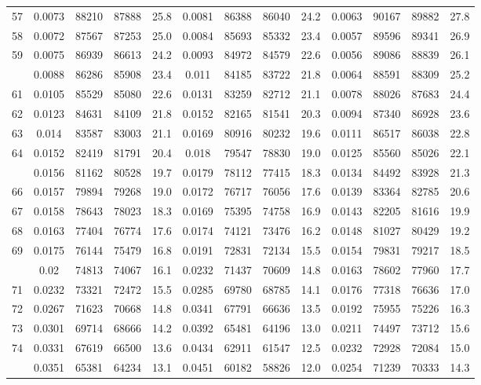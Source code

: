 \documentclass[
  14pt,
]{article}
\begin{document}
\begin{longtable}[t]{lcccccccccccc}
57 & 0.0073 & 88210 & 87888 & 25.8 & 0.0081 & 86388 & 86040 & 24.2 & 0.0063 & 90167 & 89882 & 27.8\\
58 & 0.0072 & 87567 & 87253 & 25.0 & 0.0084 & 85693 & 85332 & 23.4 & 0.0057 & 89596 & 89341 & 26.9\\
59 & 0.0075 & 86939 & 86613 & 24.2 & 0.0093 & 84972 & 84579 & 22.6 & 0.0056 & 89086 & 88839 & 26.1\\
\addlinespace
60 & 0.0088 & 86286 & 85908 & 23.4 & 0.011 & 84185 & 83722 & 21.8 & 0.0064 & 88591 & 88309 & 25.2\\
61 & 0.0105 & 85529 & 85080 & 22.6 & 0.0131 & 83259 & 82712 & 21.1 & 0.0078 & 88026 & 87683 & 24.4\\
62 & 0.0123 & 84631 & 84109 & 21.8 & 0.0152 & 82165 & 81541 & 20.3 & 0.0094 & 87340 & 86928 & 23.6\\
63 & 0.014 & 83587 & 83003 & 21.1 & 0.0169 & 80916 & 80232 & 19.6 & 0.0111 & 86517 & 86038 & 22.8\\
64 & 0.0152 & 82419 & 81791 & 20.4 & 0.018 & 79547 & 78830 & 19.0 & 0.0125 & 85560 & 85026 & 22.1\\
\addlinespace
65 & 0.0156 & 81162 & 80528 & 19.7 & 0.0179 & 78112 & 77415 & 18.3 & 0.0134 & 84492 & 83928 & 21.3\\
66 & 0.0157 & 79894 & 79268 & 19.0 & 0.0172 & 76717 & 76056 & 17.6 & 0.0139 & 83364 & 82785 & 20.6\\
67 & 0.0158 & 78643 & 78023 & 18.3 & 0.0169 & 75395 & 74758 & 16.9 & 0.0143 & 82205 & 81616 & 19.9\\
68 & 0.0163 & 77404 & 76774 & 17.6 & 0.0174 & 74121 & 73476 & 16.2 & 0.0148 & 81027 & 80429 & 19.2\\
69 & 0.0175 & 76144 & 75479 & 16.8 & 0.0191 & 72831 & 72134 & 15.5 & 0.0154 & 79831 & 79217 & 18.5\\
\addlinespace
70 & 0.02 & 74813 & 74067 & 16.1 & 0.0232 & 71437 & 70609 & 14.8 & 0.0163 & 78602 & 77960 & 17.7\\
71 & 0.0232 & 73321 & 72472 & 15.5 & 0.0285 & 69780 & 68785 & 14.1 & 0.0176 & 77318 & 76636 & 17.0\\
72 & 0.0267 & 71623 & 70668 & 14.8 & 0.0341 & 67791 & 66636 & 13.5 & 0.0192 & 75955 & 75226 & 16.3\\
73 & 0.0301 & 69714 & 68666 & 14.2 & 0.0392 & 65481 & 64196 & 13.0 & 0.0211 & 74497 & 73712 & 15.6\\
74 & 0.0331 & 67619 & 66500 & 13.6 & 0.0434 & 62911 & 61547 & 12.5 & 0.0232 & 72928 & 72084 & 15.0\\
\addlinespace
75 & 0.0351 & 65381 & 64234 & 13.1 & 0.0451 & 60182 & 58826 & 12.0 & 0.0254 & 71239 & 70333 & 14.3\\

\end{longtable}
\end{document}
